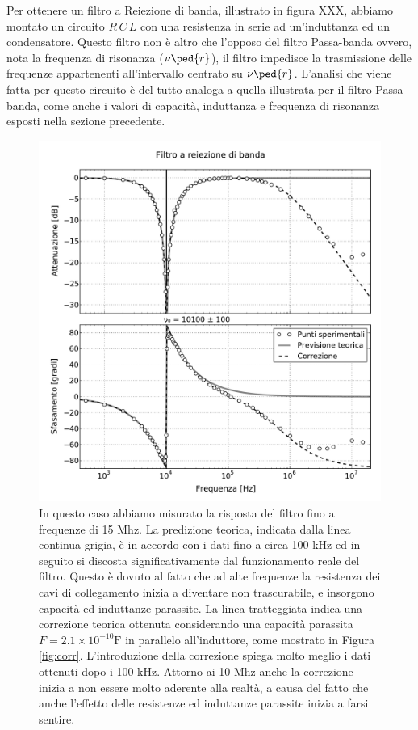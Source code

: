 Per ottenere un filtro a Reiezione di banda, illustrato in figura XXX, abbiamo montato un circuito $R\,C\,L$ con una resistenza in serie ad un'induttanza ed un condensatore.
Questo filtro non è altro che l'opposo del filtro Passa-banda ovvero, nota la frequenza di risonanza ($\nu\ped{r}$), il filtro impedisce la trasmissione delle frequenze appartenenti all'intervallo centrato su $\nu\ped{r}$. L'analisi che viene fatta per questo circuito è del tutto analoga a quella illustrata per il filtro Passa-banda, come anche i valori di capacità, induttanza e frequenza di risonanza esposti nella sezione precedente.

\begin{figure}
  \includegraphics[scale=0.55]{notch.pdf}
  \caption{In questo caso abbiamo
    misurato la risposta del filtro fino a frequenze di 15 Mhz. La predizione teorica, indicata dalla linea
    continua grigia, è in accordo con i dati fino a circa 100 kHz ed in seguito si discosta significativamente
    dal funzionamento reale del filtro. Questo è dovuto al fatto che ad alte frequenze la resistenza dei cavi
    di collegamento inizia a diventare non trascurabile, e insorgono capacità ed induttanze parassite. La linea
    tratteggiata indica una correzione teorica ottenuta considerando una capacità parassita
    $F = 2.1 \times 10^{-10} \si{\farad}$ in parallelo all'induttore, come mostrato in Figura \ref{fig:corr}.
    L'introduzione della correzione spiega molto meglio i dati ottenuti dopo i 100 kHz. Attorno ai 10 Mhz anche la
    correzione inizia a non essere molto aderente alla realtà, a causa del fatto che anche l'effetto delle resistenze
    ed induttanze parassite inizia a farsi sentire.}
  \label{fig:g_notch}
\end{figure}
